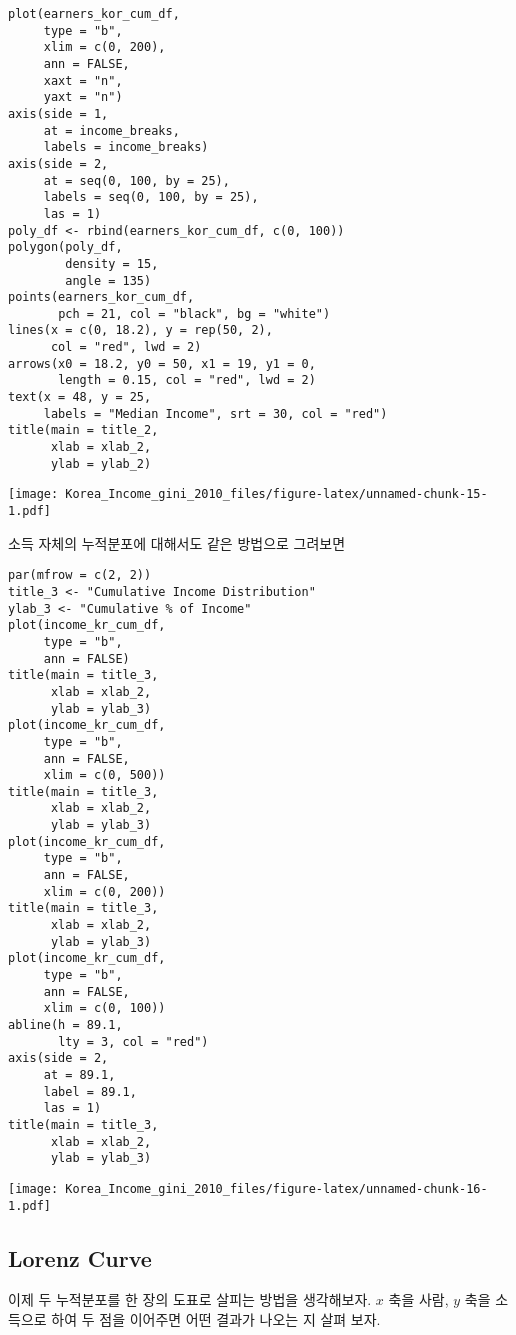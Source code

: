 \documentclass[
]{article}
\begin{document}
\begin{verbatim}
plot(earners_kor_cum_df, 
     type = "b", 
     xlim = c(0, 200), 
     ann = FALSE, 
     xaxt = "n", 
     yaxt = "n")
axis(side = 1, 
     at = income_breaks, 
     labels = income_breaks)
axis(side = 2, 
     at = seq(0, 100, by = 25), 
     labels = seq(0, 100, by = 25), 
     las = 1)
poly_df <- rbind(earners_kor_cum_df, c(0, 100))
polygon(poly_df, 
        density = 15, 
        angle = 135)
points(earners_kor_cum_df, 
       pch = 21, col = "black", bg = "white")
lines(x = c(0, 18.2), y = rep(50, 2), 
      col = "red", lwd = 2)
arrows(x0 = 18.2, y0 = 50, x1 = 19, y1 = 0, 
       length = 0.15, col = "red", lwd = 2)
text(x = 48, y = 25, 
     labels = "Median Income", srt = 30, col = "red")
title(main = title_2, 
      xlab = xlab_2, 
      ylab = ylab_2)
\end{verbatim}

\texttt{[image: Korea\_Income\_gini\_2010\_files/figure-latex/unnamed-chunk-15-1.pdf]}

소득 자체의 누적분포에 대해서도 같은 방법으로 그려보면

\begin{verbatim}
par(mfrow = c(2, 2))
title_3 <- "Cumulative Income Distribution"
ylab_3 <- "Cumulative % of Income"
plot(income_kr_cum_df, 
     type = "b", 
     ann = FALSE)
title(main = title_3, 
      xlab = xlab_2, 
      ylab = ylab_3)
plot(income_kr_cum_df, 
     type = "b", 
     ann = FALSE, 
     xlim = c(0, 500))
title(main = title_3, 
      xlab = xlab_2, 
      ylab = ylab_3)
plot(income_kr_cum_df, 
     type = "b", 
     ann = FALSE, 
     xlim = c(0, 200))
title(main = title_3, 
      xlab = xlab_2, 
      ylab = ylab_3)
plot(income_kr_cum_df, 
     type = "b", 
     ann = FALSE, 
     xlim = c(0, 100))
abline(h = 89.1, 
       lty = 3, col = "red")
axis(side = 2, 
     at = 89.1, 
     label = 89.1, 
     las = 1)
title(main = title_3, 
      xlab = xlab_2, 
      ylab = ylab_3)
\end{verbatim}

\texttt{[image: Korea\_Income\_gini\_2010\_files/figure-latex/unnamed-chunk-16-1.pdf]}

\hypertarget{lorenz-curve}{%
\subsection{Lorenz Curve}\label{lorenz-curve}}

이제 두 누적분포를 한 장의 도표로 살피는 방법을 생각해보자. \(x\) 축을
사람, \(y\) 축을 소득으로 하여 두 점을 이어주면 어떤 결과가 나오는 지
살펴 보자.
\end{document}
